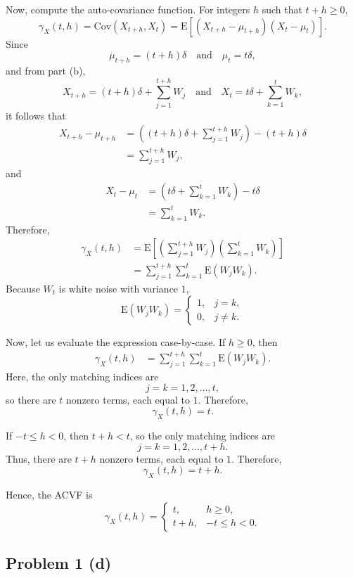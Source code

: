 \documentclass[
  10pt,
]{extarticle}
\begin{document}
Now, compute the auto-covariance function. For integers \(h\) such that \(t+h \ge 0\),
\[
\gamma_X(t,h) = \mathrm{Cov}(X_{t+h},X_t) = \mathrm{E}[(X_{t+h}-\mu_{t+h})(X_t-\mu_t)].
\]
Since
\[
\mu_{t+h} = (t+h)\delta
\quad \text{and} \quad
\mu_t = t\delta,
\]
and from part (b),
\[
X_{t+h} = (t+h)\delta + \sum_{j=1}^{t+h} W_j
\quad \text{and} \quad
X_t = t\delta + \sum_{k=1}^{t} W_k,
\]
it follows that
\[
\begin{aligned}
X_{t+h}-\mu_{t+h}
&= \left((t+h)\delta + \sum_{j=1}^{t+h} W_j\right) - (t+h)\delta \\
&= \sum_{j=1}^{t+h} W_j,
\end{aligned}
\]
and
\[
\begin{aligned}
X_t-\mu_t
&= \left(t\delta + \sum_{k=1}^{t} W_k\right) - t\delta \\
&= \sum_{k=1}^{t} W_k.
\end{aligned}
\]
Therefore,
\[
\begin{aligned}
\gamma_X(t,h)
&= \mathrm{E}\left[\left(\sum_{j=1}^{t+h} W_j\right)\left(\sum_{k=1}^{t} W_k\right)\right] \\
&= \sum_{j=1}^{t+h} \sum_{k=1}^{t} \mathrm{E}(W_jW_k).
\end{aligned}
\]
Because \(W_t\) is white noise with variance \(1\),
\[
\mathrm{E}(W_jW_k) =
\begin{cases}
1, & j=k,\\
0, & j \neq k.
\end{cases}
\]

Now, let us evaluate the expression case-by-case. If \(h \ge 0\), then
\[
\begin{aligned}
\gamma_X(t,h)
&= \sum_{j=1}^{t+h} \sum_{k=1}^{t} \mathrm{E}(W_jW_k).
\end{aligned}
\]
Here, the only matching indices are
\[
j=k=1,2,\ldots,t,
\]
so there are \(t\) nonzero terms, each equal to \(1\). Therefore,
\[
\gamma_X(t,h)=t.
\]

If \(-t \le h < 0\), then \(t+h < t\), so the only matching indices are
\[
j=k=1,2,\ldots,t+h.
\]
Thus, there are \(t+h\) nonzero terms, each equal to \(1\). Therefore,
\[
\gamma_X(t,h)=t+h.
\]

Hence, the ACVF is
\[
\gamma_X(t,h) =
\begin{cases}
t, & h \ge 0,\\
t+h, & -t \le h < 0.
\end{cases}
\]

\newpage

\subsection{Problem 1 (d)}\label{problem-1-d}
\end{document}
